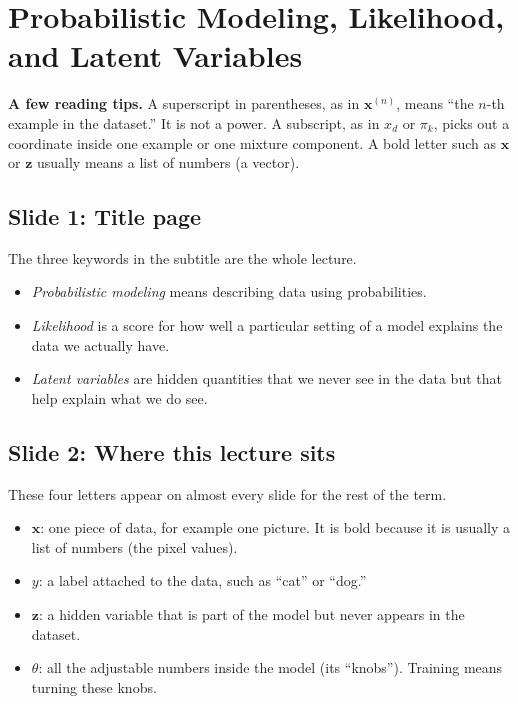 \section{Probabilistic Modeling, Likelihood, and Latent Variables}

\textbf{A few reading tips.} A superscript in parentheses, as in $\mathbf{x}^{(n)}$, means ``the $n$-th example in the dataset.'' It is not a power. A subscript, as in $x_d$ or $\pi_k$, picks out a coordinate inside one example or one mixture component. A bold letter such as $\mathbf{x}$ or $\mathbf{z}$ usually means a list of numbers (a vector).

\subsection*{Slide 1: Title page}

The three keywords in the subtitle are the whole lecture.
\begin{itemize}
\item \textit{Probabilistic modeling} means describing data using probabilities.
\item \textit{Likelihood} is a score for how well a particular setting of a model explains the data we actually have.
\item \textit{Latent variables} are hidden quantities that we never see in the data but that help explain what we do see.
\end{itemize}

\subsection*{Slide 2: Where this lecture sits}

These four letters appear on almost every slide for the rest of the term.
\begin{itemize}
\item $\mathbf{x}$: one piece of data, for example one picture. It is bold because it is usually a list of numbers (the pixel values).
\item $y$: a label attached to the data, such as ``cat'' or ``dog.''
\item $\mathbf{z}$: a hidden variable that is part of the model but never appears in the dataset.
\item $\theta$: all the adjustable numbers inside the model (its ``knobs''). Training means turning these knobs.
\end{itemize}

